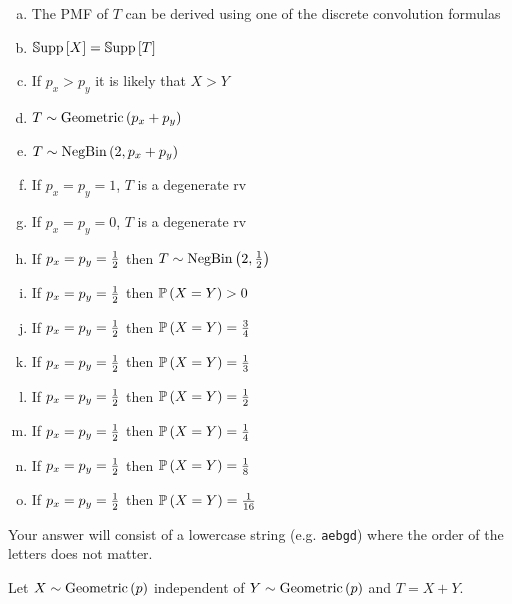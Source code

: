 \documentclass[12pt,landscape]{article}
\newcommand{\instr}{\small Your answer will consist of a lowercase string (e.g. \texttt{aebgd}) where the order of the letters does not matter. \normalsize}
\begin{document}
\begin{enumerate}[(a)]
\item The PMF of $T$ can be derived using one of the discrete convolution formulas
\item $\mathbb{S}\text{upp}\left[X\right] = \mathbb{S}\text{upp}\left[T\right]$
\item If $p_x > p_y$ it is likely that $X > Y$
\item $T \sim \mathrm{Geometric}\left(p_x+p_y\right)$
\item $T \sim \mathrm{NegBin}\left(2, p_x+p_y\right)$
\item If $p_x = p_y = 1$, $T$ is a degenerate rv
\item If $p_x = p_y = 0$, $T$ is a degenerate rv
\item If $p_x = p_y = \frac{1}{2}$ then $T \sim \mathrm{NegBin}\left(2, \frac{1}{2}\right)$
\item If $p_x = p_y = \frac{1}{2}$ then $\mathbb{P}\left(X = Y\right) > 0$
\item If $p_x = p_y = \frac{1}{2}$ then $\mathbb{P}\left(X = Y\right) = \frac{3}{4}$
\item If $p_x = p_y = \frac{1}{2}$ then $\mathbb{P}\left(X = Y\right) = \frac{1}{3}$
\item If $p_x = p_y = \frac{1}{2}$ then $\mathbb{P}\left(X = Y\right) = \frac{1}{2}$
\item If $p_x = p_y = \frac{1}{2}$ then $\mathbb{P}\left(X = Y\right) = \frac{1}{4}$
\item If $p_x = p_y = \frac{1}{2}$ then $\mathbb{P}\left(X = Y\right) = \frac{1}{8}$
\item If $p_x = p_y = \frac{1}{2}$ then $\mathbb{P}\left(X = Y\right) = \frac{1}{16}$
\end{enumerate}
\eenum\instr\pagebreak

\problem{} Let $X \sim \mathrm{Geometric}\left(p\right)$ independent of $Y \sim \mathrm{Geometric}\left(p\right)$ and $T = X + Y$.

\vspace{-0.2cm}\benum{} 
\end{document}
